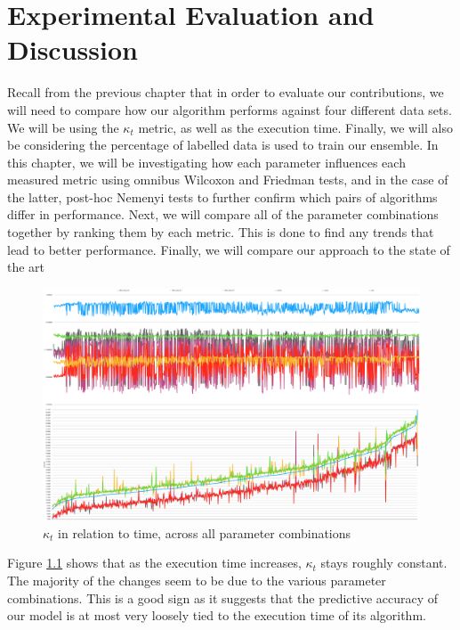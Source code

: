 
\chapter{Experimental Evaluation and Discussion} %

Recall from the previous chapter that in order to evaluate our contributions, we will need to compare how our algorithm performs against four different data sets. We will be using the $\kappa_t$ metric, as well as the execution time. Finally, we will also be considering the percentage of labelled data is used to train our ensemble.
{In this chapter, we will be investigating how each parameter influences each measured metric using omnibus Wilcoxon and Friedman tests, and in the case of the latter, post-hoc Nemenyi tests to further confirm which pairs of algorithms differ in performance. Next, we will compare all of the parameter combinations together by ranking them by each metric. This is done to find any trends that lead to better performance. Finally, we will compare our approach to the state of the art}

\label{Chapter5} %

\begin{figure}
  \includegraphics[width=\linewidth]{./images/chapter5/kappa_vs_time}
\caption{\label{fig:kappa_vs_time}$\kappa_t$ in relation to time, across all parameter combinations}
\end{figure}
Figure \ref{fig:kappa_vs_time} shows that as the execution time increases, $\kappa_t$ stays roughly constant. The majority of the changes seem to be due to the various parameter combinations. This is a good sign as it suggests that the predictive accuracy of our model is at most very loosely tied to the execution time of its algorithm.

